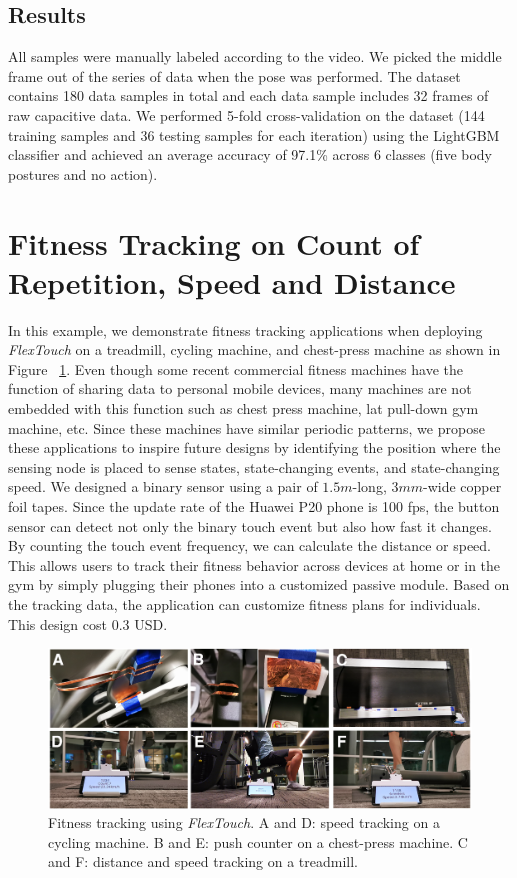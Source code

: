 \subsection{Results}
All samples were manually labeled according to the video. We picked the middle frame out of the series of data when the pose was performed. The dataset contains 180 data samples in total and each data sample includes 32 frames of raw capacitive data. We performed 5-fold cross-validation on the dataset (144 training samples and 36 testing samples for each iteration) using the LightGBM classifier and achieved an average accuracy of 97.1\% across 6 classes (five body postures and no action).

\section{Fitness Tracking on Count of Repetition, Speed and Distance}
In this example, we demonstrate fitness tracking applications when deploying \textit{FlexTouch} on a treadmill, cycling machine, and chest-press machine as shown in Figure ~\ref{fig:fitness}. Even though some recent commercial fitness machines have the function of sharing data to personal mobile devices, many machines are not embedded with this function such as chest press machine, lat pull-down gym machine, etc. Since these machines have similar periodic patterns, we propose these applications to inspire future designs by identifying the position where the sensing node is placed to sense states, state-changing events, and state-changing speed. We designed a binary sensor using a pair of $1.5m$-long, $3 mm$-wide copper foil tapes. Since the update rate of the Huawei P20 phone is 100 fps, the button sensor can detect not only the binary touch event but also how fast it changes. By counting the touch event frequency, we can calculate the distance or speed. This allows users to track their fitness behavior across devices at home or in the gym by simply plugging their phones into a customized passive module. Based on the tracking data, the application can customize fitness plans for individuals. This design cost 0.3 USD.

\begin{figure}[ht]
\centering
  \includegraphics[width=0.7\columnwidth]{figures/gym.png}
  \setlength{\belowcaptionskip}{-4pt}
  \caption{Fitness tracking using \textit{FlexTouch}. A and D: speed tracking on a cycling machine. B and E: push counter on a chest-press machine. C and F: distance and speed tracking on a treadmill.}  
  \label{fig:fitness}
\end{figure}


